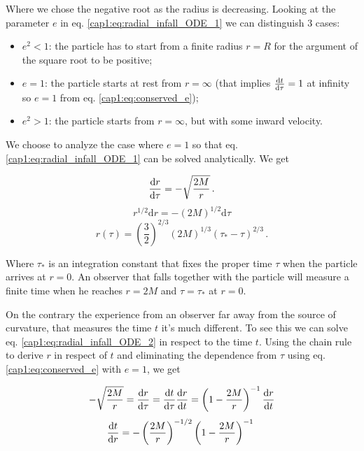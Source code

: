 Where we chose the negative root as the radius is decreasing.
Looking at the parameter $e$ in eq. \ref{cap1:eq:radial_infall_ODE_1} we can
distinguish 3 cases:

\begin{itemize}
    \item{$e^2 < 1$:} the particle has to start from a finite radius $r = R$
        for the argument of the square root to be positive;
    \item{$e = 1$:} the particle starts at rest from $r = \infty$ (that implies
        $\dv{t}{\tau} = 1$ at infinity so $e = 1$ from eq.
        \ref{cap1:eq:conserved_e});
    \item{$e^2 > 1$:} the particle starts from $r = \infty$, but with some
        inward velocity.
\end{itemize}

We choose to analyze the case where $e = 1$ so that eq.
\ref{cap1:eq:radial_infall_ODE_1} can be solved analytically.
We get

\begin{equation}
    \dv{r}{\tau} = - \sqrt{\frac{2 M}{r}} \, .
    \label{cap1:eq:radial_infall_ODE_2}
\end{equation}
\begin{equation*}
    r^{1/2} \mathrm{d}r = -(2M)^{1/2} \mathrm{d}\tau
\end{equation*}
\begin{equation}
    r(\tau) = \left(\frac{3}{2}\right)^{2/3}
    (2M)^{1/3} (\tau_* - \tau)^{2/3} \, .
    \label{cap1:eq:radial_infall_r_of_tau}
\end{equation}

Where $\tau_*$ is an integration constant that fixes the proper time $\tau$
when the particle arrives at $r = 0$.
An observer that falls together with the particle will measure a finite time
when he reaches $r = 2M$ and $\tau = \tau_*$ at $r = 0$.

On the contrary the experience from an observer far away from the source of
curvature, that measures the \Sh time $t$ it's much different.
To see this we can solve eq. \ref{cap1:eq:radial_infall_ODE_2} in respect to
the \Sh time $t$.
Using the chain rule to derive $r$ in respect of $t$ and eliminating the
dependence from $\tau$ using eq. \ref{cap1:eq:conserved_e} with $e = 1$, we get

\begin{align*}
    - \sqrt{\frac{2 M}{r}} = \dv{r}{\tau} = \dv{t}{\tau} \dv{r}{t}
    = \left(1 - \frac{2M}{r} \right)^{-1} \dv{r}{t}
\end{align*}
\begin{equation*}
    \dv{t}{r} = - \left(\frac{2 M}{r}\right)^{-1/2}
    \left(1 - \frac{2M}{r} \right)^{-1} \,  \, 
\end{equation*}

